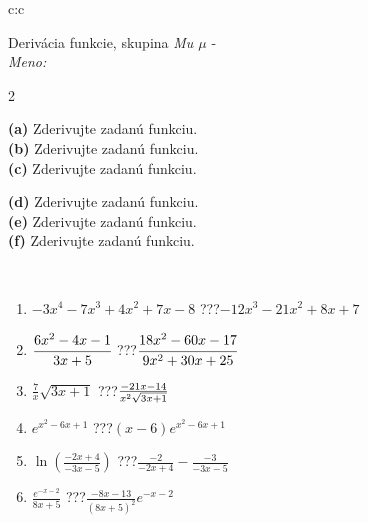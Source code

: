 \documentclass[10pt]{report}
\begin{document}
\newpage
\thispagestyle{empty}
\begin{tabular}{c:c}
\begin{minipage}[c][104.5mm][t]{0.5\linewidth}
\begin{center}
\vspace{7mm}
{\huge Derivácia funkcie, skupina \textit{Mu $\mu$} -}\\[5mm]
\textit{Meno:}\phantom{xxxxxxxxxxxxxxxxxxxxxxxxxxxxxxxxxxxxxxxxxxxxxxxxxxxxxxxxxxxxxxxxx}\\[5mm]
\begin{minipage}{0.95\linewidth}
\begin{center}
{\small \begin{multicols}{2} \raggedright
\textbf{(a)} Zderivujte zadanú funkciu. \\[1mm]
\textbf{(b)} Zderivujte zadanú funkciu. \\[1mm]
\textbf{(c)} Zderivujte zadanú funkciu. \par \columnbreak
\textbf{(d)} Zderivujte zadanú funkciu. \\[1mm]
\textbf{(e)} Zderivujte zadanú funkciu. \\[1mm]
\textbf{(f)} Zderivujte zadanú funkciu.
\end{multicols}
}
\end{center}
\end{minipage}
\\[4mm]
\begin{minipage}{0.79\linewidth}
\begin{center}
\begin{varwidth}{\linewidth}
\begin{enumerate}
\normalsize
\item $-3x^4-7x^3+4x^2+7x-8$\quad \dotfill\; ???\;\dotfill \quad $-12x^3-21x^2+8x+7$
\item $\cfrac{6x^2-4x-1}{3x+5}$\quad \dotfill\; ???\;\dotfill \quad $\cfrac{18x^2-60x-17}{9x^2+30x+25}$
\item $\frac{7}{x}\sqrt{3x+1}$\quad \dotfill\; ???\;\dotfill \quad $\frac{-21x-14}{x^2 \sqrt{\smash[b]{3x+1}}}$
\item $e^{x^2-6x+1}$\quad \dotfill\; ???\;\dotfill \quad $(x-6)e^{x^2-6x+1}$
\item $\ln{\left(\frac{-2x+4}{-3x-5}\right)}$\quad \dotfill\; ???\;\dotfill \quad $\frac{-2}{-2x+4}-\frac{-3}{-3x-5}$
\item $\frac{e^{-x-2}}{8x+5}$\quad \dotfill\; ???\;\dotfill \quad $\frac{-8x-13}{(8x+5)^2}e^{-x-2}$
\end{enumerate}

\end{varwidth}
\end{center}
\end{minipage}
\end{center}
\end{minipage}
\end{tabular}
\end{document}
